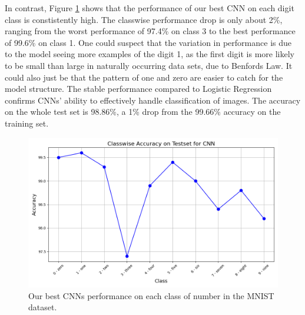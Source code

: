 In contrast, Figure \ref{fig:ClasswiseAccuracyCNN} shows that the performance of our best CNN on each digit class is constistently high. The classwise performance drop is only about 2\%, ranging from the worst performance of 97.4\% on class 3 to the best performance of 99.6\% on class 1. One could suspect that the variation in performance is due to the model seeing more examples of the digit 1, as the first digit is more likely to be small than large in naturally occurring data sets, due to Benfords Law. It could also just be that the pattern of one and zero are easier to catch for the model structure. The stable performance compared to Logistic Regression confirms CNNs' ability to effectively handle classification of images. The accuracy on the whole test set is 98.86\%, a 1\% drop from the 99.66\% accuracy on the training set.
\begin{figure}[H]
    \centering
    \includegraphics[width=\linewidth]{results/evaluation/CNN_classwise_acc.png}
    \caption{Our best CNNs performance on each class of number in the MNIST dataset.}
    \label{fig:ClasswiseAccuracyCNN}
\end{figure}

